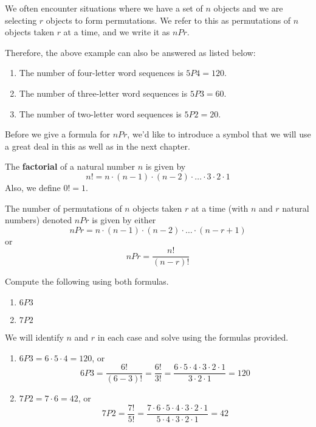 We often encounter situations where we have a set of \( n \) objects and we are selecting \( r \) objects to form permutations. We refer to this as permutations of \( n \) objects taken \( r \) at a time, and we write it as \( nPr \).

Therefore, the above example can also be answered as listed below:
\begin{enumerate}
    \item The number of four-letter word sequences is \( 5P4 = 120 \).
    \item The number of three-letter word sequences is \( 5P3 = 60 \).
    \item The number of two-letter word sequences is \( 5P2 = 20 \).
\end{enumerate}

Before we give a formula for \( nPr \), we'd like to introduce a symbol that we will use a great deal in this as well as in the next chapter.

\begin{definition}
    The \textbf{factorial} of a natural number $n$ is given by
    \[
        n! = n\cdot(n-1)\cdot(n-2)\cdot\ldots\cdot3\cdot2\cdot1
    \]
    Also, we define $0! = 1$.

\end{definition}

\begin{definition}
    The number of permutations of $n$ objects taken $r$ at a time (with $n$ and $r$ natural numbers) denoted $nPr$ is given by either
    \[
        nPr = n\cdot(n-1)\cdot(n-2)\cdot\ldots\cdot(n-r+1)
    \]
    or
    \[
        nPr = \frac{n!}{(n-r)!}
    \]
\end{definition}

\begin{example}
    Compute the following using both formulas.
    \begin{enumerate}
        \item \( 6P3 \)
        \item \( 7P2 \)
    \end{enumerate}
\end{example}

\begin{solution}
    We will identify \( n \) and \( r \) in each case and solve using the formulas provided.
    \begin{enumerate}
        \item \( 6P3 = 6 \cdot 5 \cdot 4 = 120 \), or
              \[
                  6P3 = \frac{6!}{(6-3)!} = \frac{6!}{3!} = \frac{6 \cdot 5 \cdot 4 \cdot 3 \cdot 2 \cdot 1}{3 \cdot 2 \cdot 1} = 120
              \]

        \item \( 7P2 = 7 \cdot 6 = 42 \), or
              \[
                  7P2 = \frac{7!}{5!} = \frac{7 \cdot 6 \cdot 5 \cdot 4 \cdot 3 \cdot 2 \cdot 1}{5 \cdot 4 \cdot 3 \cdot 2 \cdot 1} = 42
              \]
    \end{enumerate}
\end{solution}

